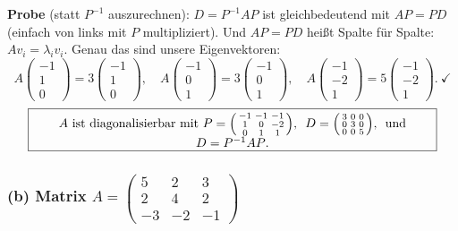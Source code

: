 \documentclass[a4paper,12pt]{article}
\begin{document}
\textbf{Probe} (statt $P^{-1}$ auszurechnen): $D = P^{-1}AP$ ist gleichbedeutend mit $AP = PD$ (einfach von links mit $P$ multipliziert). Und $AP = PD$ hei\ss t Spalte f\"ur Spalte: $A v_i = \lambda_i v_i$. Genau das sind unsere Eigenvektoren:
\[
A\begin{pmatrix}-1\\1\\0\end{pmatrix} = 3\begin{pmatrix}-1\\1\\0\end{pmatrix},\quad
A\begin{pmatrix}-1\\0\\1\end{pmatrix} = 3\begin{pmatrix}-1\\0\\1\end{pmatrix},\quad
A\begin{pmatrix}-1\\-2\\1\end{pmatrix} = 5\begin{pmatrix}-1\\-2\\1\end{pmatrix}. \ \checkmark
\]
\[
\fbox{\parbox{0.93\textwidth}{\centering
$A$ ist diagonalisierbar mit
$P = \left(\begin{smallmatrix} -1 & -1 & -1 \\ 1 & 0 & -2 \\ 0 & 1 & 1 \end{smallmatrix}\right)$,
$\ D = \left(\begin{smallmatrix} 3 & 0 & 0 \\ 0 & 3 & 0 \\ 0 & 0 & 5 \end{smallmatrix}\right)$,
\ und $D = P^{-1}AP$.
}}
\]

\subsubsection*{(b) Matrix $A = \left(\begin{smallmatrix} 5 & 2 & 3 \\ 2 & 4 & 2 \\ -3 & -2 & -1 \end{smallmatrix}\right)$}
\end{document}
